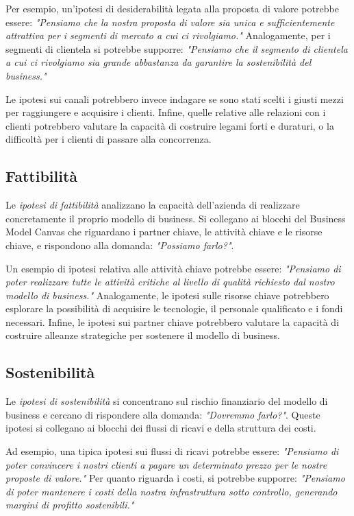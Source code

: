 Per esempio, un’ipotesi di desiderabilità legata alla proposta di valore potrebbe essere: \textit{"Pensiamo che la nostra proposta di valore sia unica e sufficientemente attrattiva per i segmenti di mercato a cui ci rivolgiamo."} Analogamente, per i segmenti di clientela si potrebbe supporre: \textit{"Pensiamo che il segmento di clientela a cui ci rivolgiamo sia grande abbastanza da garantire la sostenibilità del business."}

Le ipotesi sui canali potrebbero invece indagare se sono stati scelti i giusti mezzi per raggiungere e acquisire i clienti. Infine, quelle relative alle relazioni con i clienti potrebbero valutare la capacità di costruire legami forti e duraturi, o la difficoltà per i clienti di passare alla concorrenza.

\subsection{Fattibilità}
Le \textit{ipotesi di fattibilità} analizzano la capacità dell’azienda di realizzare concretamente il proprio modello di business. Si collegano ai blocchi del Business Model Canvas che riguardano i partner chiave, le attività chiave e le risorse chiave, e rispondono alla domanda: \textit{"Possiamo farlo?"}.

Un esempio di ipotesi relativa alle attività chiave potrebbe essere: \textit{"Pensiamo di poter realizzare tutte le attività critiche al livello di qualità richiesto dal nostro modello di business."} Analogamente, le ipotesi sulle risorse chiave potrebbero esplorare la possibilità di acquisire le tecnologie, il personale qualificato e i fondi necessari. Infine, le ipotesi sui partner chiave potrebbero valutare la capacità di costruire alleanze strategiche per sostenere il modello di business.

\subsection{Sostenibilità}
Le \textit{ipotesi di sostenibilità} si concentrano sul rischio finanziario del modello di business e cercano di rispondere alla domanda: \textit{"Dovremmo farlo?"}. Queste ipotesi si collegano ai blocchi dei flussi di ricavi e della struttura dei costi.

Ad esempio, una tipica ipotesi sui flussi di ricavi potrebbe essere: \textit{"Pensiamo di poter convincere i nostri clienti a pagare un determinato prezzo per le nostre proposte di valore."} Per quanto riguarda i costi, si potrebbe supporre: \textit{"Pensiamo di poter mantenere i costi della nostra infrastruttura sotto controllo, generando margini di profitto sostenibili."}


